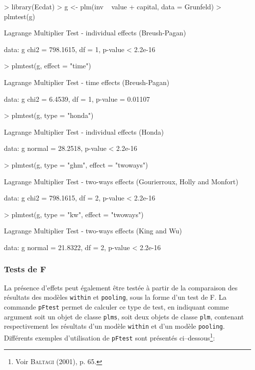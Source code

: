 \documentclass[a4paper]{article}
\begin{document}
\begin{Schunk}
\begin{Sinput}
> library(Ecdat)
> g <- plm(inv ~ value + capital, data = Grunfeld)
> plmtest(g)
\end{Sinput}
\begin{Soutput}
	Lagrange Multiplier Test - individual effects (Breush-Pagan)

data:  g 
chi2 = 798.1615, df = 1, p-value < 2.2e-16
\end{Soutput}
\begin{Sinput}
> plmtest(g, effect = "time")
\end{Sinput}
\begin{Soutput}
	Lagrange Multiplier Test - time effects (Breush-Pagan)

data:  g 
chi2 = 6.4539, df = 1, p-value = 0.01107
\end{Soutput}
\begin{Sinput}
> plmtest(g, type = "honda")
\end{Sinput}
\begin{Soutput}
	Lagrange Multiplier Test - individual effects (Honda)

data:  g 
normal = 28.2518, p-value < 2.2e-16
\end{Soutput}
\begin{Sinput}
> plmtest(g, type = "ghm", effect = "twoways")
\end{Sinput}
\begin{Soutput}
	Lagrange Multiplier Test - two-ways effects (Gourierroux, Holly and
	Monfort)

data:  g 
chi2 = 798.1615, df = 2, p-value < 2.2e-16
\end{Soutput}
\begin{Sinput}
> plmtest(g, type = "kw", effect = "twoways")
\end{Sinput}
\begin{Soutput}
	Lagrange Multiplier Test - two-ways effects (King and Wu)

data:  g 
normal = 21.8322, df = 2, p-value < 2.2e-16
\end{Soutput}
\end{Schunk}



\subsubsection{Tests de F}

La présence d'effets peut également être testée à partir de la
comparaison des  résultats des modèles \texttt{within} et
\texttt{pooling}, sous la forme d'un test de F. La commande
\texttt{pFtest} permet de calculer ce type de test, en indiquant comme
argument soit un objet de classe \texttt{plms}, soit deux objets de
classe \texttt{plm}, contenant respectivement les résultats d'un
modèle \texttt{within} et d'un modèle \texttt{pooling}.
Différents exemples d'utilisation de \texttt{pFtest}
sont présentés ci--dessous\footnote{Voir \textsc{Baltagi} (2001),
  p. 65.}:
\end{document}
